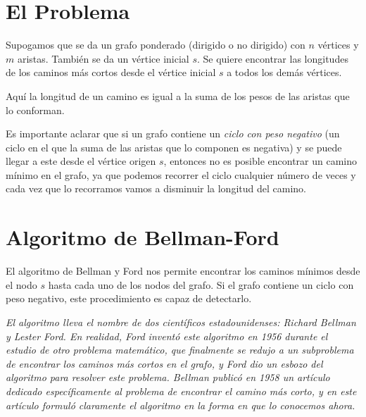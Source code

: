 \documentclass[a4paper, 10pt]{article}
\title{\vspace{30ex}\Large{ \texttt{Conferencia #2:} \\ \textbf{Caminos M\'inimos desde un Origen} \\ \today}}
\author{\textit{Luis Enrique Saborit Gonz\'alez}}
\date{}
\numberwithin{theoremCounter}{subsection}
\numberwithin{problemCounter}{subsection}
\numberwithin{defCounter}{subsection}
\numberwithin{obsCounter}{subsection}
\numberwithin{methCounter}{subsection}
\numberwithin{exampleCounter}{subsection}
\numberwithin{propCounter}{subsection}
\theoremstyle{violetnumbox}
\theoremstyle{blacknumex}
\begin{document}

\maketitle
\vspace*{\fill}


\begin{flushright}
\textit{

}
\vspace{3cm}
\end{flushright}

\newpage

\begin{multicols}{2}
\tableofcontents
\newpage
\pagestyle{fancy}

\section{El Problema}
    Supogamos que se da un grafo ponderado (dirigido o no dirigido) con $n$ vértices y $m$ aristas.
    También se da un vértice inicial $s$. Se quiere encontrar las longitudes de los caminos más cortos desde
    el vértice inicial $s$ a todos los demás vértices.

    Aqu\'i la longitud de un camino es igual a la suma de los pesos de las aristas que lo conforman.

    Es importante aclarar que si un grafo contiene un \textit{ciclo con peso negativo} (un ciclo en el que la suma de las aristas que lo componen es negativa) y se puede llegar a este desde el v\'ertice origen $s$, entonces no es posible encontrar un camino m\'inimo en el grafo, ya que podemos recorrer el ciclo cualquier n\'umero de veces y cada vez que lo recorramos vamos a disminuir la longitud del camino.

\section{Algoritmo de Bellman-Ford}
    El algoritmo de Bellman y Ford nos permite encontrar los caminos m\'inimos desde el nodo $s$ hasta cada uno de los nodos del grafo. Si el grafo contiene un ciclo con peso negativo, este procedimiento es capaz de detectarlo.

    \textit{El algoritmo lleva el nombre de dos científicos estadounidenses: Richard Bellman y Lester Ford. En realidad, Ford inventó este algoritmo en 1956 durante el estudio de otro problema matemático, que finalmente se redujo a un subproblema de encontrar los caminos más cortos en el grafo, y Ford dio un esbozo del algoritmo para resolver este problema. Bellman publicó en 1958 un artículo dedicado específicamente al problema de encontrar el camino más corto, y en este artículo formuló claramente el algoritmo en la forma en que lo conocemos ahora.}


\end{multicols}
\end{document}
